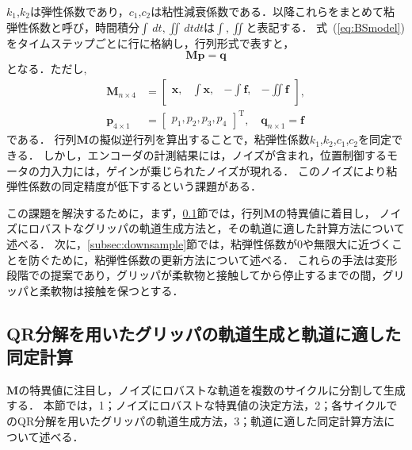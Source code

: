 \documentclass[a4paper]{jarticle}
\begin{document}
$k_1$,$k_2$は弾性係数であり，$c_1$,$c_2$は粘性減衰係数である．以降これらをまとめて粘弾性係数と呼び，時間積分$\int \,dt, \iint \,dtdt $は$\int, \iint$と表記する．
式~(\ref{eq:BSmodel})をタイムステップごとに行に格納し，行列形式で表すと，
\begin{equation}
    \mathbf{M}\mathbf{p} = \mathbf{q} 
    \label{eq:Mp_q}
\end{equation}
となる．ただし,
\begin{equation}
    \begin{aligned}
        \mathbf{M}_{n \times 4} &= \begin{bmatrix}
            \boldsymbol{x}, & \int{\boldsymbol{x}}, & -\int{\boldsymbol{f}}, & -\iint{\boldsymbol{f}}\\
        \end{bmatrix}, \\
        \mathbf{p}_{4 \times 1}  &= \begin{bmatrix}
            p_1 ,p_2 ,p_3 ,p_4
        \end{bmatrix}^{\mathrm{T}}, \quad
        \mathbf{q}_{n \times 1}   = \boldsymbol{f}
    \end{aligned}
\label{eq:BSmodel_matrix}
\end{equation}
である．
行列$\mathbf{M}$の擬似逆行列を算出することで，粘弾性係数$k_1$,$k_2$,$c_1$,$c_2$を同定できる．
しかし，エンコーダの計測結果には，ノイズが含まれ，位置制御するモータの力入力には，ゲインが乗じられたノイズが現れる．
このノイズにより粘弾性係数の同定精度が低下するという課題がある．

この課題を解決するために，まず，\ref{subsec:QR_traj_and_calculation}節では，行列$\mathbf{M}$の特異値に着目し，
ノイズにロバストなグリッパの軌道生成方法と，その軌道に適した計算方法について述べる．
次に，\ref{subsec:downsample}節では，粘弾性係数が0や無限大に近づくことを防ぐために，粘弾性係数の更新方法について述べる．
これらの手法は変形段階での提案であり，グリッパが柔軟物と接触してから停止するまでの間，グリッパと柔軟物は接触を保つとする．
\subsection{QR分解を用いたグリッパの軌道生成と軌道に適した同定計算}\label{subsec:QR_traj_and_calculation}
$\mathbf{M}$の特異値に注目し，ノイズにロバストな軌道を複数のサイクルに分割して生成する．
本節では，1；ノイズにロバストな特異値の決定方法，2；各サイクルでのQR分解を用いたグリッパの軌道生成方法，3；軌道に適した同定計算方法について述べる．
\end{document}
